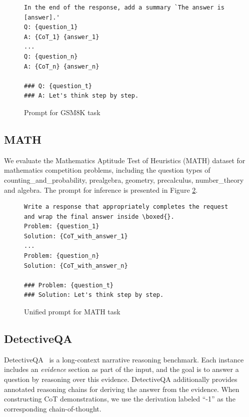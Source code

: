 \documentclass{article}
\theoremstyle{plain}
\theoremstyle{definition}
\theoremstyle{remark}
\begin{document}
\begin{figure}[ht]
    \centering
    {\tiny
\begin{lstlisting}
In the end of the response, add a summary `The answer is [answer].'
Q: {question_1}
A: {CoT_1} {answer_1}
...
Q: {question_n}
A: {CoT_n} {answer_n}

### Q: {question_t}
### A: Let's think step by step.
\end{lstlisting}
}
    \caption{Prompt for GSM8K task}
    \label{fig:prompt_gsm8k}
\end{figure}




\subsection{MATH}
We evaluate the Mathematics Aptitude Test of Heuristics (MATH) dataset for mathematics competition problems, including the question types of counting\_and\_probability, prealgebra, geometry, precalculus, number\_theory and algebra. The prompt for inference is presented in Figure \ref{fig:prompt_math}. %

\begin{figure}[ht]
    \centering
    {\tiny
\begin{lstlisting}
Write a response that appropriately completes the request and wrap the final answer inside \boxed{}.
Problem: {question_1}
Solution: {CoT_with_answer_1}
...
Problem: {question_n}
Solution: {CoT_with_answer_n}

### Problem: {question_t}
### Solution: Let's think step by step.
\end{lstlisting}
}
    \caption{Unified prompt for MATH task}
    \label{fig:prompt_math}
\end{figure}





\subsection{DetectiveQA}
DetectiveQA~\cite{xu2025detectiveqaevaluatinglongcontextreasoning} is a long-context narrative reasoning benchmark. Each instance includes an \emph{evidence} section as part of the input, and the goal is to answer a question by reasoning over this evidence. DetectiveQA additionally provides annotated reasoning chains for deriving the answer from the evidence. When constructing CoT demonstrations, we use the derivation labeled ``-1'' as the corresponding chain-of-thought.
\end{document}
